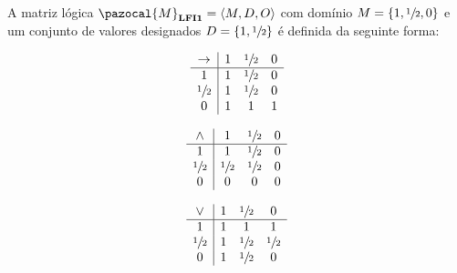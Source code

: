         \begin{definicao}
            A matriz lógica $\pazocal{M}_{\lfium{}} = \langle M, D, O \rangle$ com domínio $M = \{1, \sfrac{1}{2}{}, 0\}$ e um conjunto de valores designados $D = \{1, \sfrac{1}{2}{}\}$ é definida da seguinte forma:
            

            \vspace{\baselineskip} %

            \noindent
            \begin{minipage}{0.3\textwidth}
                \[
                    \begin{array}{c|ccc}%
                        \to & 1 & \meio{} & 0 \\
                        \hline%
                        1           & 1 & \meio{} & 0 \\
                        \meio{} & 1 & \meio{} & 0 \\
                        0           & 1 & 1           & 1 \\
                    \end{array}
                \]
            \end{minipage}
            \begin{minipage}{0.3\textwidth}
                \[
                    \begin{array}{c|ccc}%
                        \land       & 1           & \meio{} & 0 \\
                        \hline%
                        1           & 1           & \meio{} & 0 \\
                        \meio{} & \meio{} & \meio{} & 0 \\
                        0           & 0           & 0           & 0 \\
                    \end{array}
                \]
            \end{minipage}
            \begin{minipage}{0.3\textwidth}
                \[
                    \begin{array}{c|ccc}%
                        \lor        & 1 & \meio{} & 0           \\
                        \hline%
                        1           & 1 & 1           & 1           \\
                        \meio{} & 1 & \meio{} & \meio{} \\
                        0           & 1 & \meio{} & 0           \\
                    \end{array}
                \]
            \end{minipage}


\end{definicao}
